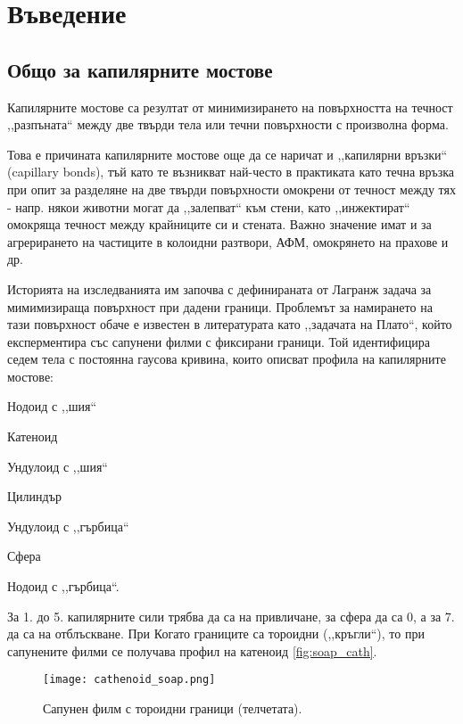\section{Въведение}
\subsection{Общо за капилярните мостове}
Капилярните мостове са резултат от минимизирането на повърхността на течност
,,разпъната`` между две твърди тела или течни повърхности с произволна форма.

Това е причината капилярните мостове още да се наричат и ,,капилярни връзки`` (capillary bonds),
тъй като те възникват най-често в практиката като течна връзка при опит за разделяне на две
твърди повърхности омокрени от течност между тях - напр. някои животни могат да ,,залепват`` към
стени, като ,,инжектират`` омокряща течност между \cite{Persson_2007} крайниците си и стената.
Важно значение имат и за агрерирането на частиците в колоидни разтвори, АФМ, омокрянето на прахове и др.

Историята на изследванията им започва с дефинираната от Лагранж задача за мимимизираща повърхност
при дадени граници. Проблемът за намирането на тази повърхност обаче е известен в литературата
като ,,задачата на Плато``, който експерментира със сапунени филми с фиксирани граници.
Той идентифицира седем тела с постоянна гаусова кривина, които описват профила на капилярните мостове:
\begin{enumerate*}
    \item Нодоид с ,,шия``
    \item Катеноид
    \item Ундулоид с ,,шия``
    \item Цилиндър
    \item Ундулоид с ,,гърбица``
    \item Сфера
    \item Нодоид с ,,гърбица``.
\end{enumerate*}
За 1. до 5. капилярните сили трябва да са на привличане, за сфера да са 0, а за 7. да са на
отблъскване. При \cite{Kralchevsky}
Когато границите са тороидни (,,кръгли``), то при сапунените филми се получава профил на катеноид \autoref{fig:soap_cath}.
\begin{figure}[h]
    \centering
    \texttt{[image: cathenoid\_soap.png]}
    \caption{Сапунен филм с тороидни граници (телчетата).\cite{Soap_cathenoid}}
    \label{fig:soap_cath}
\end{figure}

